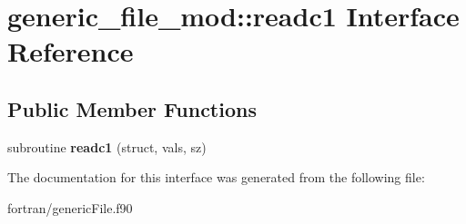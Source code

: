 \hypertarget{interfacegeneric__file__mod_1_1readc1}{}\section{generic\+\_\+file\+\_\+mod\+:\+:readc1 Interface Reference}
\label{interfacegeneric__file__mod_1_1readc1}
\subsection*{Public Member Functions}
\begin{DoxyCompactItemize}
\item 
\mbox{\label{interfacegeneric__file__mod_1_1readc1_afd260f3624f382c1cfc38bec5d08a0c7}} 
subroutine {\bfseries readc1} (struct, vals, sz)
\end{DoxyCompactItemize}


The documentation for this interface was generated from the following file\+:\begin{DoxyCompactItemize}
\item 
fortran/generic\+File.\+f90\end{DoxyCompactItemize}
